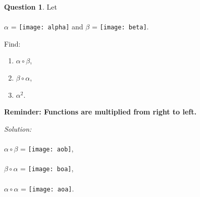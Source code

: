 \documentclass[a4paper,12pt]{article}
\theoremstyle{definition}
\newtheorem{question}{Question}%
\theoremstyle{remark}
\begin{document}
\begin{question}
Let \\
\textcolor{white}{.}  \\

$\alpha$ = \texttt{[image: alpha]} \qquad and \qquad $\beta$ = \texttt{[image: beta]}. 

\vspace{1cm}


Find:
\begin{enumerate}
\item $\alpha \circ \beta$,
\item $\beta \circ \alpha$,
\item $\alpha^2$.
\end{enumerate}
\textbf{Reminder: Functions are multiplied from right to left.}
\vspace{0.5em}
\end{question}
\newpage
\textit{Solution:}\\
\textcolor{white}{.}  \\
$\alpha \circ \beta$ = \texttt{[image: aob]}, \\ 
\textcolor{white}{.} \\
$\beta \circ \alpha$ = \texttt{[image: boa]},\\ 
\textcolor{white}{.} \\
$\alpha \circ \alpha$ = \texttt{[image: aoa]}.\\ 







\end{document}

